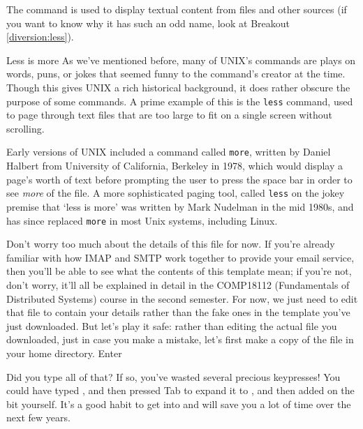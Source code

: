The  command is used to display textual content from files and other sources (if you want to know why it has such an odd name, look at Breakout \ref{diversion:less}). 

\begin{diversion}{Less is more}
\label{diversion:less}
As we've mentioned before, many of UNIX's commands are plays on words, puns, or jokes that seemed funny to the command's creator at the time. Though this gives UNIX a rich historical background, it does rather obscure the purpose of some commands. A prime example of this is the \texttt{less} command, used to page through text files that are too large to fit on a single screen without scrolling. 

Early versions of UNIX included a command called \texttt{more}, written by Daniel Halbert from University of California, Berkeley in 1978, which would display a page's worth of text before prompting the user to press the space bar in order to see \textit{more} of the file. A more sophisticated paging tool, called \texttt{less} on the jokey premise that `less is more' was written by Mark Nudelman in the mid 1980s, and has since replaced \texttt{more} in most Unix systems, including Linux. 
\end{diversion}

Don't worry too much about the details of this file for now. If you're already familiar with how IMAP and SMTP work together to provide your email service, then you'll be able to see what the contents of this template mean; if you're not, don't worry, it'll all be explained in detail in the COMP18112 (Fundamentals of Distributed Systems) course in the second semester. For now, we just need to edit that file to contain your details rather than the fake ones in the template you've just downloaded. But let's play it safe: rather than editing the actual file you downloaded, just in case you make a mistake, let's first make a copy of the file in your home directory. Enter


Did you type all of that? If so, you've wasted several precious keypresses! You could have typed , and then pressed Tab to expand it to , and then added on the  bit yourself. It's a good habit to get into and will save you a lot of time over the next few years.

